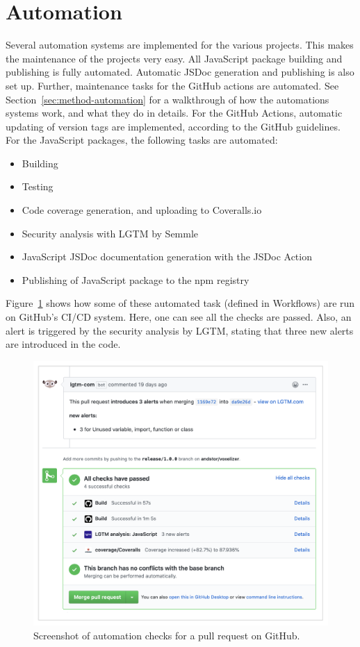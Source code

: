 \section{Automation}
\label{sec:result-automation}
Several automation systems are implemented for the various projects. This makes the maintenance of the projects very easy. All JavaScript package building and publishing is fully automated. Automatic JSDoc generation and publishing is also set up. Further, maintenance tasks for the GitHub actions are automated. See Section~\ref{sec:method-automation} for a walkthrough of how the automations systems work, and what they do in details. For the GitHub Actions, automatic updating of version tags are implemented, according to the GitHub guidelines. For the JavaScript packages, the following tasks are automated:
\begin{itemize}
    \item Building
    \item Testing
    \item Code coverage generation, and uploading to Coveralls.io
    \item Security analysis with LGTM by Semmle
    \item JavaScript JSDoc documentation generation with the JSDoc Action
    \item Publishing of JavaScript package to the npm registry
\end{itemize}
Figure~\ref{fig:automation-pull-request} shows how some of these automated task (defined in Workflows) are run on GitHub's CI/CD system. Here, one can see all the checks are passed. Also, an alert is triggered by the security analysis by LGTM, stating that three new alerts are introduced in the code.
\begin{figure}[htp]
    \centering
    \includegraphics[width=\textwidth]{sections/result/figures/automation-pull-request.png}
    \caption{Screenshot of automation checks for a pull request on GitHub.}
    \label{fig:automation-pull-request}
\end{figure}


